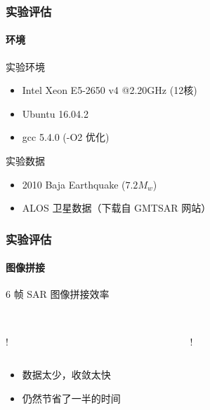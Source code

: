\documentclass{beamer}
\begin{document}
\begin{frame}
    \frametitle{实验评估}
    \framesubtitle{环境}

    \begin{block}{实验环境}
        \small
        \begin{itemize}
            \setlength\itemsep{-0.1em}
            \item Intel Xeon E5-2650 v4 @2.20GHz (12核)
            \item Ubuntu 16.04.2
            \item gcc 5.4.0 (-O2 优化)
        \end{itemize}
    \end{block}
 
    \begin{block}{实验数据}
        \small
        \begin{itemize}
            \setlength\itemsep{-0.1em}
            \item 2010 Baja Earthquake ($7.2 M_w$)
            \item ALOS 卫星数据（下载自 GMTSAR 网站）
        \end{itemize}
    \end{block}
\end{frame}


\begin{frame}
    \frametitle{实验评估}
    \framesubtitle{图像拼接}

    6 帧 SAR 图像拼接效率 \\~\\
    \begin{columns}
        \begin{column}{0.5\textwidth}
            \centering
            \resizebox {\textwidth} {!} {
                
            }
        \end{column}
        \begin{column}{0.5\textwidth}
            \centering
            \resizebox {\textwidth} {!} {
                
            }
        \end{column}
    \end{columns}

    \begin{itemize}
        \small
        \setlength\itemsep{-0.1em}
        \item 数据太少，收敛太快
        \item 仍然节省了一半的时间
    \end{itemize}
\end{frame}
\end{document}
